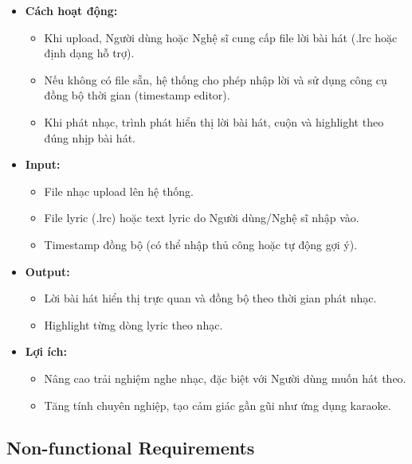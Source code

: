 \documentclass[a4paper]{article}
\begin{document}
\begin{itemize}
	\item \textbf{Cách hoạt động:}
	      \begin{itemize}
		      \item Khi upload, Người dùng hoặc Nghệ sĩ cung cấp file lời bài hát (.lrc hoặc định dạng hỗ trợ).
		      \item Nếu không có file sẵn, hệ thống cho phép nhập lời và sử dụng công cụ đồng bộ thời gian (timestamp editor).
		      \item Khi phát nhạc, trình phát hiển thị lời bài hát, cuộn và highlight theo đúng nhịp bài hát.
	      \end{itemize}

	\item \textbf{Input:}
	      \begin{itemize}
		      \item File nhạc upload lên hệ thống.
		      \item File lyric (.lrc) hoặc text lyric do Người dùng/Nghệ sĩ nhập vào.
		      \item Timestamp đồng bộ (có thể nhập thủ công hoặc tự động gợi ý).
	      \end{itemize}

	\item \textbf{Output:}
	      \begin{itemize}
		      \item Lời bài hát hiển thị trực quan và đồng bộ theo thời gian phát nhạc.
		      \item Highlight từng dòng lyric theo nhạc.
	      \end{itemize}

	\item \textbf{Lợi ích:}
	      \begin{itemize}
		      \item Nâng cao trải nghiệm nghe nhạc, đặc biệt với Người dùng muốn hát theo.
		      \item Tăng tính chuyên nghiệp, tạo cảm giác gần gũi như ứng dụng karaoke.
	      \end{itemize}
\end{itemize}

\subsection{Non-functional Requirements}
\end{document}
